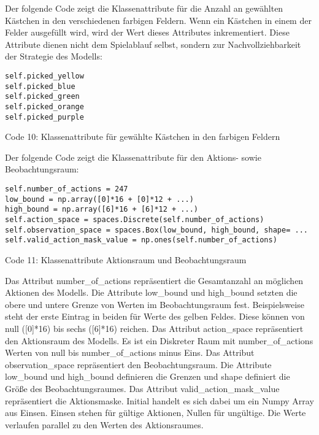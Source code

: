 \begin{minipage}{\linewidth}
Der folgende Code zeigt die Klassenattribute für die Anzahl an gewählten Kästchen in den verschiedenen farbigen Feldern. Wenn ein Kästchen in einem der Felder ausgefüllt wird, wird der Wert dieses Attributes inkrementiert. Diese Attribute dienen nicht dem Spielablauf selbst, sondern zur Nachvollziehbarkeit der Strategie des Modells:
\vspace{0.5cm}
\begin{lstlisting}
self.picked_yellow
self.picked_blue
self.picked_green
self.picked_orange
self.picked_purple
\end{lstlisting}
Code 10: Klassenattribute für gewählte Kästchen in den farbigen Feldern\\
\end{minipage}

\begin{minipage}{\linewidth}
Der folgende Code zeigt die Klassenattribute für den Aktions- sowie Beobachtungsraum:
\vspace{0.5cm}
\begin{lstlisting}
self.number_of_actions = 247
low_bound = np.array([0]*16 + [0]*12 + ...)
high_bound = np.array([6]*16 + [6]*12 + ...)
self.action_space = spaces.Discrete(self.number_of_actions)
self.observation_space = spaces.Box(low_bound, high_bound, shape= ...
self.valid_action_mask_value = np.ones(self.number_of_actions)
\end{lstlisting}
Code 11: Klassenattribute Aktionsraum und Beobachtungsraum\\
\end{minipage}

Das Attribut number\_of\_actions repräsentiert die Gesamtanzahl an möglichen Aktionen des Modells. Die Attribute low\_bound und high\_bound setzten die obere und untere Grenze von Werten im Beobachtungsraum fest. Beispielsweise steht der erste Eintrag in beiden für Werte des gelben Feldes. Diese können von null ([0]*16) bis sechs ([6]*16) reichen. Das Attribut action\_space repräsentiert den Aktionsraum des Modells. Es ist ein Diskreter Raum mit number\_of\_actions Werten von null bis number\_of\_actions minus Eins. Das Attribut observation\_space repräsentiert den Beobachtungsraum. Die Attribute low\_bound und high\_bound definieren die Grenzen und shape definiert die Größe des Beobachtungsraumes. Das Attribut valid\_action\_mask\_value repräsentiert die Aktionsmaske. Initial handelt es sich dabei um ein Numpy Array aus Einsen. Einsen stehen für gültige Aktionen, Nullen für ungültige. Die Werte verlaufen parallel zu den Werten des Aktionsraumes.
